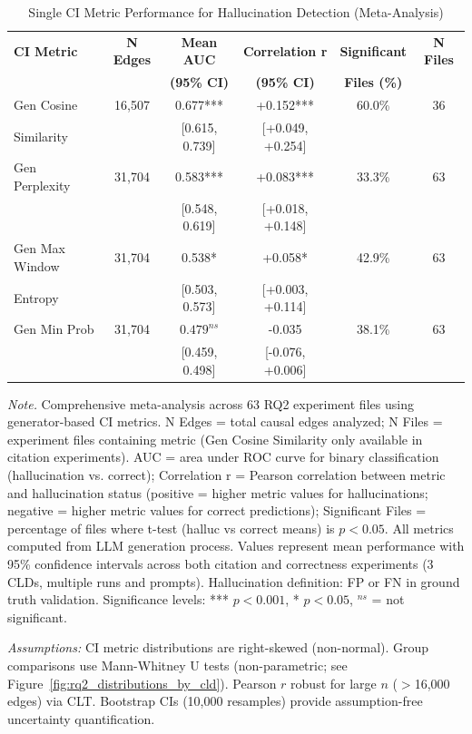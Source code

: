 \documentclass{article}
\begin{document}
\begin{table}[H]
\centering
\caption{Single CI Metric Performance for Hallucination Detection (Meta-Analysis)}
\label{tab:rq2_single_metrics}
\begin{threeparttable}
\begin{tabular}{lccccc}
\toprule
\textbf{CI Metric} & \textbf{N Edges} & \textbf{Mean AUC} & \textbf{Correlation r} & \textbf{Significant} & \textbf{N Files} \\
 & & \textbf{(95\% CI)} & \textbf{(95\% CI)} & \textbf{Files (\%)} & \\
\midrule
Gen Cosine            & 16,507 & 0.677*** & +0.152*** & 60.0\% & 36 \\
Similarity            &        & [0.615, 0.739] & [+0.049, +0.254] & & \\
\midrule
Gen Perplexity        & 31,704 & 0.583*** & +0.083*** & 33.3\% & 63 \\
                      &        & [0.548, 0.619] & [+0.018, +0.148] & & \\
\midrule
Gen Max Window        & 31,704 & 0.538* & +0.058* & 42.9\% & 63 \\
Entropy               &        & [0.503, 0.573] & [+0.003, +0.114] & & \\
\midrule
Gen Min Prob          & 31,704 & $0.479^{ns}$ & -0.035 & 38.1\% & 63 \\
                      &        & [0.459, 0.498] & [-0.076, +0.006] & & \\
\bottomrule
\end{tabular}
\begin{tablenotes}
\small
\item \textit{Note.} Comprehensive meta-analysis across 63 RQ2 experiment files using generator-based CI metrics. 
N Edges = total causal edges analyzed; N Files = experiment files containing metric (Gen Cosine Similarity only available in citation experiments).
AUC = area under ROC curve for binary classification (hallucination vs. correct); 
Correlation r = Pearson correlation between metric and hallucination status (positive = higher metric values for hallucinations; negative = higher metric values for correct predictions); 
Significant Files = percentage of files where t-test (halluc vs correct means) is $p < 0.05$. 
All metrics computed from LLM generation process. 
Values represent mean performance with 95\% confidence intervals across both citation and correctness experiments (3 CLDs, multiple runs and prompts). 
Hallucination definition: FP or FN in ground truth validation.
Significance levels: *** $p<0.001$, * $p<0.05$, $^{ns}$ = not significant.
\item \textit{Assumptions:} CI metric distributions are right-skewed (non-normal). Group comparisons use Mann-Whitney U tests (non-parametric; see Figure~\ref{fig:rq2_distributions_by_cld}). Pearson $r$ robust for large $n$ ($>$16{,}000 edges) via CLT. Bootstrap CIs (10{,}000 resamples) provide assumption-free uncertainty quantification.
\end{tablenotes}
\end{threeparttable}
\end{table}
\end{document}
